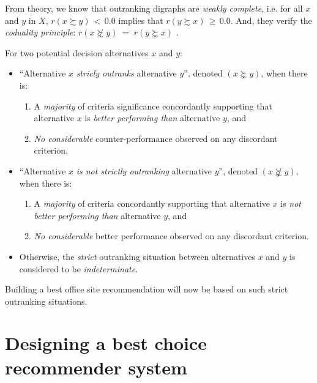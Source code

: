 From theory, we know that outranking digraphs are \emph{weakly complete}, i.e. for all $x$ and $y$ in $X$, $r(x \succsim y)\, <\, 0.0$ implies that $r(y \succsim x)\, \geq\, 0.0$. And, they verify the \emph{coduality principle}:  $r(x \not\succsim y) \;=\; r(y \succnsim x)$ \citep{BIS-2013}.

\begin{definition}\label{def:strictOutranking}

\noindent For two potential decision alternatives $x$ and $y$:
\begin{itemize}[leftmargin=0.5cm,rightmargin=0.5cm]
\item ``Alternative $x$ \emph{stricly outranks} alternative $y$'', denoted $(x \succnsim y)$, when there is:
   \begin{enumerate}[topsep=0pt]
     \item A \emph{majority} of criteria significance concordantly supporting that alternative $x$ is \emph{better performing than} alternative $y$, and
     \item \emph{No considerable} counter-performance observed on any discordant criterion.      
    \end{enumerate}
\item ``Alternative $x$ \emph{is not strictly outranking} alternative $y$'', denoted $(x \not\succnsim y)$, when there is:
   \begin{enumerate}[topsep=0pt]
    \item A \emph{majority} of criteria concordantly supporting that alternative $x$ is \emph{not better performing than} alternative $y$, and
    \item \emph{No considerable} better performance observed on any discordant criterion. 
    \end{enumerate}
\item Otherwise, the \emph{strict} outranking situation between alternatives $x$ and $y$ is considered to be \emph{indeterminate}.
\end{itemize}
\end{definition}

Building a best office site recommendation will now be based on such strict outranking situations.

\section{Designing a best choice recommender system}
\label{sec:4.4}

